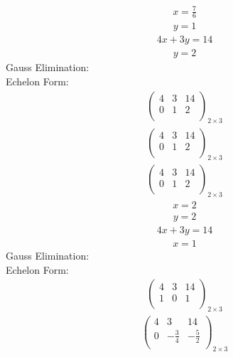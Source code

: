 \documentclass{article}
\begin{document}
\begin{align*}
x=\frac{7}{6}\end{align*}
\begin{align*}
y=1\end{align*}
\begin{align*}
4x + 3y=14\end{align*}
\begin{align*}
y=2\end{align*}
Gauss Elimination:\\
Echelon Form:\\
\begin{align*}
\left(
\begin{array}{cc|c}
4 & 3 & 14\\
0 & 1 & 2\\
\end{array}
\right)_{2\times 3}
\end{align*}
\begin{align*}
\left(
\begin{array}{cc|c}
4 & 3 & 14\\
0 & 1 & 2\\
\end{array}
\right)_{2\times 3}
\end{align*}
\begin{align*}
\left(
\begin{array}{cc|c}
4 & 3 & 14\\
0 & 1 & 2\\
\end{array}
\right)_{2\times 3}
\end{align*}
\begin{align*}
x=2\end{align*}
\begin{align*}
y=2\end{align*}
\begin{align*}
4x + 3y=14\end{align*}
\begin{align*}
x=1\end{align*}
Gauss Elimination:\\
Echelon Form:\\
\begin{align*}
\left(
\begin{array}{cc|c}
4 & 3 & 14\\
1 & 0 & 1\\
\end{array}
\right)_{2\times 3}
\end{align*}
\begin{align*}
\left(
\begin{array}{cc|c}
4 & 3 & 14\\
0 & -\frac{3}{4} & -\frac{5}{2}\\
\end{array}
\right)_{2\times 3}
\end{align*}
\end{document}

